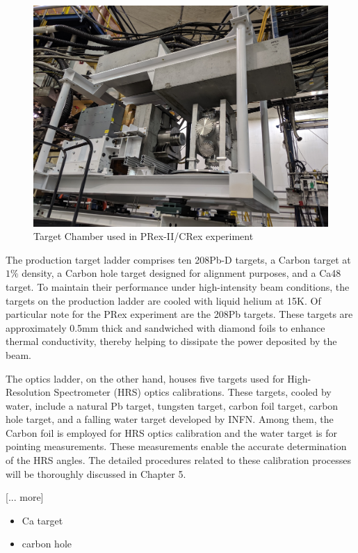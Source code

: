 \begin{figure}[!htbp]
    \centering
    \includegraphics[width=\textwidth]{images/chap3/target_chamber.jpg}
    \caption{Target Chamber used in PRex-II/CRex experiment}
    \label{fig:target_chamber_photo}
\end{figure}

The production target ladder comprises ten 208Pb-D targets, a Carbon target at $1\%$ density, a Carbon hole target designed for alignment purposes, and a Ca48 target. To maintain their performance under high-intensity beam conditions, the targets on the production ladder are cooled with liquid helium at 15K. Of particular note for the PRex experiment are the 208Pb targets. These targets are approximately 0.5mm thick and sandwiched with diamond foils to enhance thermal conductivity, thereby helping to dissipate the power deposited by the beam.

The optics ladder, on the other hand, houses five targets used for High-Resolution Spectrometer (HRS) optics calibrations. These targets, cooled by water, include a natural Pb target, tungsten target, carbon foil target, carbon hole target, and a falling water target developed by INFN. Among them, the Carbon foil is employed for HRS optics calibration and the water target is for pointing measurements. These measurements enable the accurate determination of the HRS angles. The detailed procedures related to these calibration processes will be thoroughly discussed in Chapter 5.

[... more]

\begin{itemize}
    \item Ca target
    \item carbon hole 
\end{itemize}


